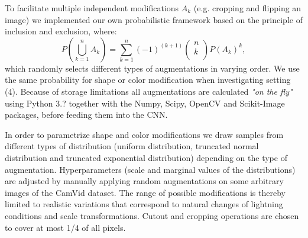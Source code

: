 \documentclass[a0paper,portrait]{baposter}
\begin{document}
\begin{poster}
{To facilitate multiple independent modifications $A_k$ (e.g. cropping and flipping an image) we implemented our own probabilistic framework based on the principle of inclusion and exclusion, where:
\[P\left(\bigcup_{k=1}^{n} A_k\right) = \sum_{k=1}^{n} (-1)^{(k+1)} \begin{pmatrix} n \\ k \\\end{pmatrix}P(A_k)^k,\]
which randomly selects different types of augmentations in varying order. We use the same probability for shape or color modification when investigating setting (4). Because of storage limitations all augmentations are calculated \textit{"on the fly"} using {\color{darkblue} Python 3.?} together with the {\color{darkblue} Numpy}, {\color{darkblue} Scipy}, {\color{darkblue} OpenCV} and {\color{darkblue} Scikit-Image} packages, before feeding them into the CNN.

In order to parametrize shape and color modifications we draw samples from different types of distribution (uniform distribution, truncated normal distribution and truncated exponential distribution) depending on the type of augmentation. Hyperparameters (scale and marginal values of the distributions) are adjusted by manually applying random augmentations on some arbitrary images of the CamVid dataset. The range of possible modifications is thereby limited to realistic variations that correspond to natural changes of lightning conditions and scale transformations. Cutout and cropping operations are chosen to cover at most 1/4 of all pixels.

\vspace{20px}

}







\end{poster}
\end{document}
